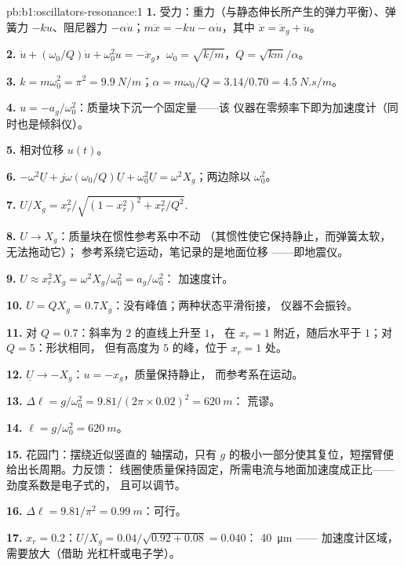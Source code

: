 \begin{solution}{pb:b1:oscillators-resonance:1}
\textbf{1.} 受力：重力（与静态伸长所产生的弹力平衡）、弹簧力
$-ku$、阻尼器力 $-\alpha\dot u$；$m\ddot x = -ku - \alpha\dot u$，其中 $\ddot x =
\ddot x_g + \ddot u$。

\textbf{2.} $\ddot u + (\omega_0/Q)\dot u + \omega_0^2u = -\ddot x_g$，$\omega_0 =
\sqrt{k/m}$，$Q = \sqrt{km}/\alpha$。

\textbf{3.} $k = m\omega_0^2 = \pi^2 = \qty{9.9}{N/m}$；$\alpha = m\omega_0/Q =
3.14/0.70 = \qty{4.5}{N.s/m}$。

\textbf{4.} $u = -a_g/\omega_0^2$：质量块下沉一个固定量——该
仪器在零频率下即为加速度计（同时也是倾斜仪）。

\textbf{5.} 相对位移 $u(t)$。

\textbf{6.} $-\omega^2\underline U + j\omega(\omega_0/Q)\underline U + \omega_0^2\underline U
= \omega^2X_g$；两边除以 $\omega_0^2$。

\textbf{7.} $U/X_g = x_r^2/\sqrt{(1 - x_r^2)^2 + x_r^2/Q^2}$.

\textbf{8.} $U \to X_g$：质量块在惯性参考系中不动
（其惯性使它保持静止，而弹簧太软，无法拖动它）；
参考系绕它运动，笔记录的是地面位移
——即地震仪。

\textbf{9.} $U \approx x_r^2X_g = \omega^2X_g/\omega_0^2 = a_g/\omega_0^2$：
加速度计。

\textbf{10.} $U = QX_g = 0.7X_g$：没有峰值；两种状态平滑衔接，
仪器不会振铃。

\textbf{11.} 对 $Q = 0.7$：斜率为 $2$ 的直线上升至 $1$，
在 $x_r = 1$ 附近，随后水平于 $1$；对 $Q = 5$：形状相同，
但有高度为 $5$ 的峰，位于 $x_r = 1$ 处。

\textbf{12.} $\underline U \to -X_g$：$u = -x_g$，质量保持静止，
而参考系在运动。

\textbf{13.} $\Delta\ell = g/\omega_0^2 = 9.81/(2\pi \times 0.02)^2 = \qty{620}{m}$：
荒谬。

\textbf{14.} $\ell = g/\omega_0^2 = \qty{620}{m}$。

\textbf{15.} 花园门：摆绕近似竖直的
轴摆动，只有 $g$ 的极小一部分使其复位，短摆臂便给出长周期。力反馈：
线圈使质量保持固定，所需电流与地面加速度成正比——
劲度系数是电子式的，
且可以调节。

\textbf{16.} $\Delta\ell = 9.81/\pi^2 = \qty{0.99}{m}$：可行。

\textbf{17.} $x_r = 0.2$：$U/X_g = 0.04/\sqrt{0.92 + 0.08} = 0.040$：
\qty{40}{\micro m} —— 加速度计区域，需要放大（借助
光杠杆或电子学）。


\end{solution}
